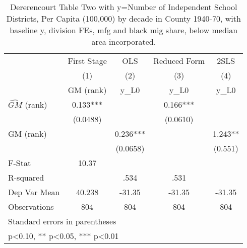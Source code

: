 \begin{table}[htbp]\centering
\def\sym#1{\ifmmode^{#1}\else\(^{#1}\)\fi}
\caption{Dererencourt Table Two with y=Number of Independent School Districts, Per Capita (100,000) by decade in County 1940-70, with baseline y, division FEs, mfg and black mig share, below median area incorporated.}
\begin{tabular}{l*{4}{c}}
\toprule
                    & First Stage   &         OLS   &Reduced Form   &        2SLS   \\
                    &\multicolumn{1}{c}{(1)}&\multicolumn{1}{c}{(2)}&\multicolumn{1}{c}{(3)}&\multicolumn{1}{c}{(4)}\\
                    &\multicolumn{1}{c}{GM  (rank)}&\multicolumn{1}{c}{y\_L0}&\multicolumn{1}{c}{y\_L0}&\multicolumn{1}{c}{y\_L0}\\
\midrule
$\hat{GM}$ (rank)   &       0.133***&               &       0.166***&               \\
                    &    (0.0488)   &               &    (0.0610)   &               \\
\addlinespace
GM  (rank)          &               &       0.236***&               &       1.243** \\
                    &               &    (0.0658)   &               &     (0.551)   \\
\midrule
F-Stat              &       10.37   &               &               &               \\
R-squared           &               &        .534   &        .531   &               \\
Dep Var Mean        &      40.238   &      -31.35   &      -31.35   &      -31.35   \\
Observations        &         804   &         804   &         804   &         804   \\
\bottomrule
\multicolumn{5}{l}{\footnotesize Standard errors in parentheses}\\
\multicolumn{5}{l}{\footnotesize * p<0.10, ** p<0.05, *** p<0.01}\\
\end{tabular}
\end{table}
